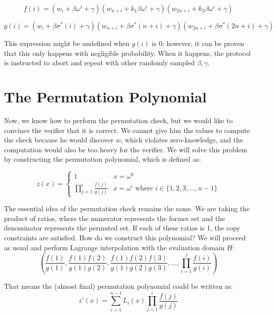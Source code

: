 \begin{equation}
\label{eq:prem-func}
    f(i) = (w_{i} + \beta \omega^i + \gamma)(w_{n+i} + k_1\beta\omega^i  + \gamma)(w_{2n+i} + k_2\beta\omega^i+ \gamma)
\end{equation}

\begin{equation}
    g(i) = (w_{i} + \beta\sigma^*(i) + \gamma)(w_{n+i} + \beta\sigma^*(n+i) + \gamma)(w_{2n+i} + \beta\sigma^*(2n+i) + \gamma)
\end{equation}


 
This expression might be undefined when $g(i)$ is 0; however, it can be proven that this only happens with negligible probability. When it happens, the protocol is instructed to abort and repeat with other randomly sampled $\beta, \gamma$.


\section{The Permutation Polynomial}
Now, we know how to perform the permutation check, but we would like to convince the verifier that it is correct. We cannot give him the values to compute the check because he would discover $w$, which violates zero-knowledge, and the computation would also be too heavy for the verifier. We will solve this problem by constructing the permutation polynomial, which is defined as:

\begin{equation}
    z(x) = 
    \begin{cases} 
          1 & x = \omega^0 \\
          \prod_{j=1}^{i} \frac{f(j)}{g(j)} & x = \omega^i \text{ where } i \in \{1, 2, 3, \ldots, n-1\}
    \end{cases}
\end{equation}


The essential idea of the permutation check remains the same. We are taking the product of ratios, where the numerator represents the former set and the denominator represents the permuted set. If each of these ratios is 1, the copy constraints are satisfied. How do we construct this polynomial? We will proceed as usual and perform Lagrange interpolation with the evaluation domain $H$:
$$(\frac{f(1)}{g(1)}, \frac{f(1)f(2)}{g(1)g(2)}, \frac{f(1)f(2)f(3)}{g(1)g(2)g(3)}, \ldots, \prod_{i=1}^{j} \frac{f(i)}{g(i)})$$

That means the (almost final) permutation polynomial could be written as:
$$z'(x) = \sum_{i=1}^{n-1} L_{i}(x) \prod_{j=1}^i \frac{f(j)}{g(j)}$$

